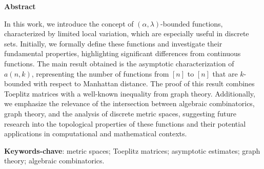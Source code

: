 \begin{center}
  \large \textbf{Abstract}
\end{center}
\vspace{1cm}
\par In this work, we introduce the concept of $(\alpha, \lambda)$-bounded functions, characterized by limited local variation, which are especially useful in discrete sets. Initially, we formally define these functions and investigate their fundamental properties, highlighting significant differences from continuous functions. The main result obtained is the asymptotic characterization of $a(n, k)$, representing the number of functions from $[n]$ to $[n]$ that are $k$-bounded with respect to Manhattan distance. The proof of this result combines Toeplitz matrices with a well-known inequality from graph theory. Additionally, we emphasize the relevance of the intersection between algebraic combinatorics, graph theory, and the analysis of discrete metric spaces, suggesting future research into the topological properties of these functions and their potential applications in computational and mathematical contexts.

\vspace{1cm}

\begin{raggedleft}
  \textbf{Keywords-chave}: metric spaces; Toeplitz matrices; asymptotic estimates; graph theory; algebraic combinatorics.
\end{raggedleft}
